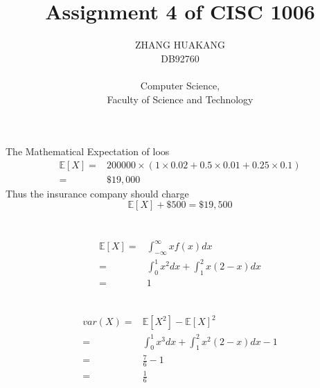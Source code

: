 \documentclass{article}
\title{Assignment 4 of CISC 1006}
\author{ZHANG HUAKANG \\ DB92760 \\ \\ Computer Science, \\Faculty of Science and Technology}
\begin{document}
    \maketitle
    \section{}
        The Mathematical Expectation of loos
        \begin{equation*}
            \begin{split}
                \mathbb{E}[X]=&200000\times(1\times 0.02+0.5\times 0.01+0.25\times 0.1)\\
                    =&\$19,000
            \end{split}
        \end{equation*}
        Thus the insurance company should charge
        $$\mathbb{E}[X]+\$500=\$19,500$$
    \section{}
        \subsection{}
            \begin{equation*}
                \begin{split}
                    \mathbb{E}[X]=&\int_{-\infty}^\infty xf(x)dx\\
                        =&\int_{0}^1 x^2dx+\int_1^2 x(2-x)dx\\
                        =&1\\
                \end{split}
            \end{equation*}
        \subsection{}
            \begin{equation*}
                \begin{split}
                    var(X)=&\mathbb{E}[X^2]-\mathbb{E}[X]^2\\
                        =&\int_{0}^1 x^3dx+\int_1^2 x^2(2-x)dx-1\\
                        =&\frac{7}{6}-1\\
                        =&\frac{1}{6}
                \end{split}
            \end{equation*}
\end{document}

